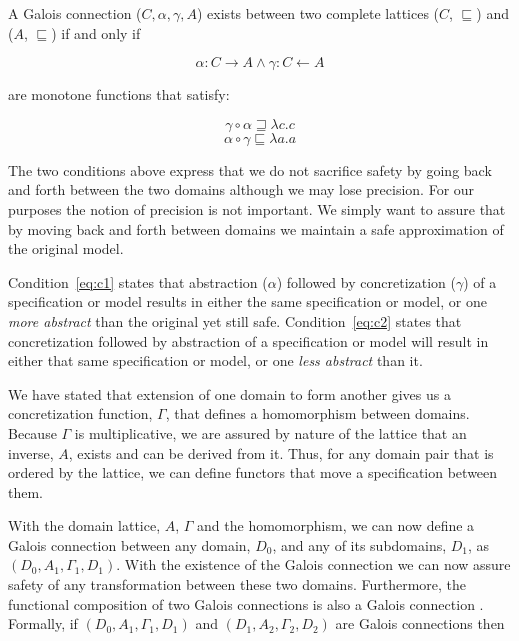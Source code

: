 \documentclass[12pt]{article}
\begin{document}
A Galois connection ($C,\alpha,\gamma,A$) exists between two complete
lattices ($C$, $\sqsubseteq$) and ($A$, $\sqsubseteq$) if and only if

\[\alpha:C \rightarrow A \wedge \gamma:C \leftarrow A\]

\noindent are monotone functions that satisfy:

\begin{equation}
\label{eq:c1}
\gamma \circ \alpha \sqsupseteq \lambda c.c
\end{equation}
\begin{equation}
\label{eq:c2}
\alpha \circ \gamma \sqsubseteq \lambda a.a
\end{equation}

The two conditions above express that we do not sacrifice safety by
going back and forth between the two domains although we may lose
precision.  For our purposes the notion of precision is not important.
We simply want to assure that by moving back and forth between domains
we maintain a safe approximation of the original model.

Condition~\ref{eq:c1} states that abstraction ($\alpha$) followed by
concretization ($\gamma$) of a specification or model results in
either the same specification or model, or one \emph{more abstract}
than the original yet still safe.  Condition~\ref{eq:c2} states that
concretization followed by abstraction of a specification or model
will result in either that same specification or model, or one
\emph{less abstract} than it.

We have stated that extension of one domain to form another gives us a
concretization function, $\Gamma$, that defines a homomorphism between
domains.  Because $\Gamma$ is multiplicative, we are assured by nature
of the lattice that an inverse, $A$, exists and can be derived from
it.  Thus, for any domain pair that is ordered by the lattice, we can
define functors that move a specification between them.

With the domain lattice, $A$, $\Gamma$ and the homomorphism, we can
now define a Galois connection between any domain, $D_0$, and any of
its subdomains, $D_1$, as $(D_0,A_1,\Gamma_1,D_1)$.  With the
existence of the Galois connection we can now assure safety of any
transformation between these two domains.  Furthermore, the functional
composition of two Galois connections is also a Galois connection
\cite{Nielson:05:Principles-of-P}. Formally, if $(D_0, A_1, \Gamma_1,
D_1)$ and $(D_1, A_2, \Gamma_2,D_2)$ are Galois connections then
\end{document}
